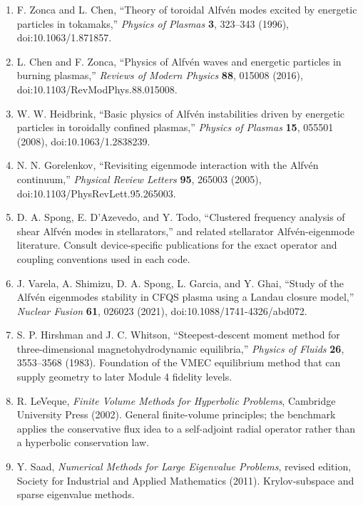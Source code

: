 \begin{enumerate}[leftmargin=1.8em]
\item F. Zonca and L. Chen, ``Theory of toroidal Alfv\'en modes excited by energetic particles in tokamaks,'' \emph{Physics of Plasmas} \textbf{3}, 323--343 (1996), doi:10.1063/1.871857.

\item L. Chen and F. Zonca, ``Physics of Alfv\'en waves and energetic particles in burning plasmas,'' \emph{Reviews of Modern Physics} \textbf{88}, 015008 (2016), doi:10.1103/RevModPhys.88.015008.

\item W. W. Heidbrink, ``Basic physics of Alfv\'en instabilities driven by energetic particles in toroidally confined plasmas,'' \emph{Physics of Plasmas} \textbf{15}, 055501 (2008), doi:10.1063/1.2838239.

\item N. N. Gorelenkov, ``Revisiting eigenmode interaction with the Alfv\'en continuum,'' \emph{Physical Review Letters} \textbf{95}, 265003 (2005), doi:10.1103/PhysRevLett.95.265003.

\item D. A. Spong, E. D'Azevedo, and Y. Todo, ``Clustered frequency analysis of shear Alfv\'en modes in stellarators,'' and related stellarator Alfv\'en-eigenmode literature. Consult device-specific publications for the exact operator and coupling conventions used in each code.

\item J. Varela, A. Shimizu, D. A. Spong, L. Garcia, and Y. Ghai, ``Study of the Alfv\'en eigenmodes stability in CFQS plasma using a Landau closure model,'' \emph{Nuclear Fusion} \textbf{61}, 026023 (2021), doi:10.1088/1741-4326/abd072.

\item S. P. Hirshman and J. C. Whitson, ``Steepest-descent moment method for three-dimensional magnetohydrodynamic equilibria,'' \emph{Physics of Fluids} \textbf{26}, 3553--3568 (1983). Foundation of the VMEC equilibrium method that can supply geometry to later Module 4 fidelity levels.

\item R. LeVeque, \emph{Finite Volume Methods for Hyperbolic Problems}, Cambridge University Press (2002). General finite-volume principles; the benchmark applies the conservative flux idea to a self-adjoint radial operator rather than a hyperbolic conservation law.

\item Y. Saad, \emph{Numerical Methods for Large Eigenvalue Problems}, revised edition, Society for Industrial and Applied Mathematics (2011). Krylov-subspace and sparse eigenvalue methods.


\end{enumerate}
